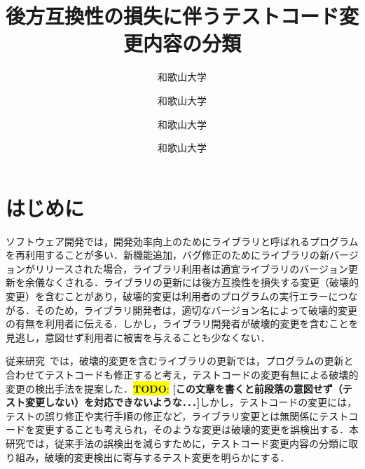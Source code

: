 \documentclass[uplatex,dvipdfmx,a4paper,twocolumn,base=11pt,jbase=11pt,ja=standard]{bxjsarticle}  %
\title{後方互換性の損失に伴うテストコード変更内容の分類}{A classification of test code changes accompanied by a lack of backward compatibility}
\author{和歌山大学}{前川　大樹}{Daiki Maekawa, Wakayama University}
\author{和歌山大学}{伊原　彰紀}{Akinori Ihara, Wakayama University}
\author{和歌山大学}{大森　楓己}{Fuki Omori, Wakayama University}
\author{和歌山大学}{才木　一也}{Kazuya Saiki, Wakayama University}
\newcommand{\todo}[1]{\colorbox{yellow}{{\bf TODO}:}{\color{red} {\textbf{[#1]}}}}
\begin{document}
\maketitle

\section{はじめに}

ソフトウェア開発では，開発効率向上のためにライブラリと呼ばれるプログラムを再利用することが多い．新機能追加，バグ修正のためにライブラリの新バージョンがリリースされた場合，ライブラリ利用者は適宜ライブラリのバージョン更新を余儀なくされる．ライブラリの更新には後方互換性を損失する変更（破壊的変更）を含むことがあり，破壊的変更は利用者のプログラムの実行エラーにつながる．そのため，ライブラリ開発者は，適切なバージョン名によって破壊的変更の有無を利用者に伝える．しかし，ライブラリ開発者が破壊的変更を含むことを見逃し，意図せず利用者に被害を与えることも少なくない．


従来研究~\cite{FOSE2021_Matsuda}では，破壊的変更を含むライブラリの更新では，プログラムの更新と合わせてテストコードも修正すると考え，テストコードの変更有無による破壊的変更の検出手法を提案した．\todo{この文章を書くと前段落の意図せず（テスト変更しない）を対応できないような．．．}しかし，テストコードの変更には，テストの誤り修正や実行手順の修正など，ライブラリ変更とは無関係にテストコードを変更することも考えられ，そのような変更は破壊的変更を誤検出する．本研究では，従来手法の誤検出を減らすために，テストコード変更内容の分類に取り組み，破壊的変更検出に寄与するテスト変更を明らかにする．
\end{document}
